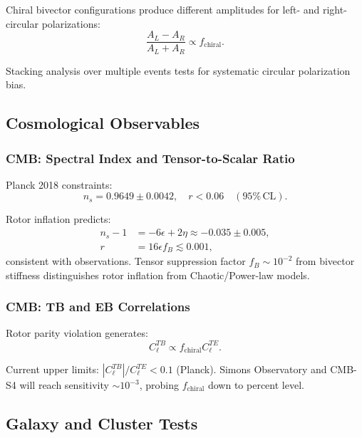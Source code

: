 \documentclass[11pt,a4paper]{article}
\numberwithin{equation}{section}
\theoremstyle{plain}
\theoremstyle{definition}
\theoremstyle{remark}
\begin{document}
Chiral bivector configurations produce different amplitudes for left- and right-circular polarizations:
\begin{equation}
\frac{A_L - A_R}{A_L + A_R} \propto f_{\mathrm{chiral}}.
\end{equation}

Stacking analysis over multiple events tests for systematic circular polarization bias.

\subsection{Cosmological Observables}

\subsubsection{CMB: Spectral Index and Tensor-to-Scalar Ratio}

Planck 2018 constraints:
\begin{equation}
n_s = 0.9649 \pm 0.0042, \quad r < 0.06 \quad (95\%\,\mathrm{CL}).
\end{equation}

Rotor inflation predicts:
\begin{align}
n_s - 1 &= -6\epsilon + 2\eta \approx -0.035 \pm 0.005,\\
r &= 16\epsilon f_B \lesssim 0.001,
\end{align}
consistent with observations. Tensor suppression factor $f_B \sim 10^{-2}$ from bivector stiffness distinguishes rotor inflation from Chaotic/Power-law models.

\subsubsection{CMB: TB and EB Correlations}

Rotor parity violation generates:
\begin{equation}
C_\ell^{TB} \propto f_{\mathrm{chiral}} C_\ell^{TE}.
\end{equation}

Current upper limits: $|C_\ell^{TB}|/C_\ell^{TE} < 0.1$ (Planck). Simons Observatory and CMB-S4 will reach sensitivity $\sim 10^{-3}$, probing $f_{\mathrm{chiral}}$ down to percent level.

\subsection{Galaxy and Cluster Tests}
\end{document}
